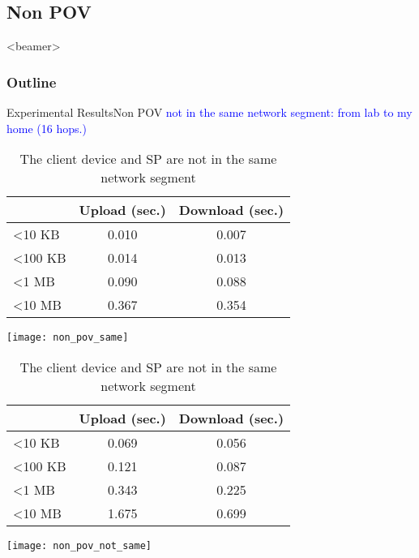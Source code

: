 \subsection{Non POV}
\begin{frame}<beamer>
    \frametitle{Outline}
    \tableofcontents[currentsubsection]
\end{frame}

\begin{frame}{Experimental Results}{Non POV}
	\textcolor{blue}{not in the same network segment: from lab to my home (16 hops.)}\\
    \tiny
    \begin{table}[]
        \centering
        \begin{minipage}[c]{0.5\textwidth}
            \caption{The client device and SP are in the \newline same network segment}
            \begin{tabular}{lcc}
                                 & Upload (sec.) & Download (sec.) \\ \hline
                \textless 10 KB  & 0.010      & 0.007        \\ \hline
                \textless 100 KB & 0.014      & 0.013        \\ \hline
                \textless 1 MB   & 0.090      & 0.088        \\ \hline
                \textless 10 MB  & 0.367      & 0.354        \\ \hline
            \end{tabular}
            \begin{center}
                \texttt{[image: non\_pov\_same]}
            \end{center}
        \end{minipage}%
        \begin{minipage}[c]{0.5\textwidth}
            \caption{The client device and SP are \alert{not} in the \newline same network segment}
            \begin{tabular}{lcc}
                                 & Upload (sec.) & Download (sec.) \\ \hline
                \textless 10 KB  & 0.069      & 0.056        \\ \hline
                \textless 100 KB & 0.121      & 0.087        \\ \hline
                \textless 1 MB   & 0.343      & 0.225        \\ \hline
                \textless 10 MB  & 1.675      & 0.699        \\ \hline
            \end{tabular}
            \begin{center}
                \texttt{[image: non\_pov\_not\_same]}
            \end{center}
        \end{minipage}
    \end{table}
\end{frame}

